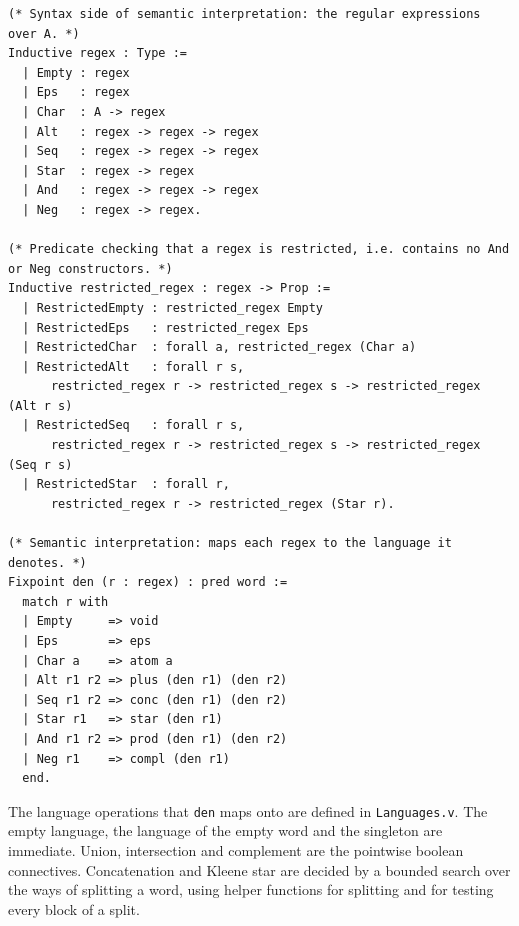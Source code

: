 \begin{lstlisting}[style=rocqstyle,caption={Regular expressions, the restricted fragment, and the semantics (\texttt{RegexSemantics.v}).},label={lst:regex}]
(* Syntax side of semantic interpretation: the regular expressions over A. *)
Inductive regex : Type :=
  | Empty : regex
  | Eps   : regex
  | Char  : A -> regex
  | Alt   : regex -> regex -> regex
  | Seq   : regex -> regex -> regex
  | Star  : regex -> regex
  | And   : regex -> regex -> regex
  | Neg   : regex -> regex.

(* Predicate checking that a regex is restricted, i.e. contains no And or Neg constructors. *)
Inductive restricted_regex : regex -> Prop :=
  | RestrictedEmpty : restricted_regex Empty
  | RestrictedEps   : restricted_regex Eps
  | RestrictedChar  : forall a, restricted_regex (Char a)
  | RestrictedAlt   : forall r s,
      restricted_regex r -> restricted_regex s -> restricted_regex (Alt r s)
  | RestrictedSeq   : forall r s,
      restricted_regex r -> restricted_regex s -> restricted_regex (Seq r s)
  | RestrictedStar  : forall r,
      restricted_regex r -> restricted_regex (Star r).

(* Semantic interpretation: maps each regex to the language it denotes. *)
Fixpoint den (r : regex) : pred word :=
  match r with
  | Empty     => void
  | Eps       => eps
  | Char a    => atom a
  | Alt r1 r2 => plus (den r1) (den r2)
  | Seq r1 r2 => conc (den r1) (den r2)
  | Star r1   => star (den r1)
  | And r1 r2 => prod (den r1) (den r2)
  | Neg r1    => compl (den r1)
  end.
\end{lstlisting}

The language operations that \texttt{den} maps onto are defined in
\texttt{Languages.v}. The empty language, the language of the empty word and the
singleton are immediate. Union, intersection and complement are the pointwise
boolean connectives. Concatenation and Kleene star are decided by a bounded
search over the ways of splitting a word, using helper functions for splitting and
for testing every block of a split.

